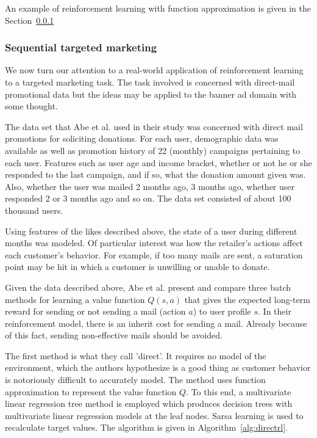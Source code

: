 \documentclass{article} %
\begin{document}
An example of reinforcement learning with function approximation is given in
the Section~\ref{sec:sequential-targeted-marketing}




\subsubsection{Sequential targeted marketing}
\label{sec:sequential-targeted-marketing}
We now turn our attention to a real-world application of reinforcement learning
to a targeted marketing task. The task \cite{abe2002empirical} involved is
concerned with direct-mail promotional data but the ideas may be applied to the
banner ad domain with some thought.

The data set that Abe et al. \cite{abe2002empirical} used in their study was
concerned with direct mail promotions for soliciting donations. For each user,
demographic data was available as well as promotion history of 22 (monthly)
campaigns pertaining to each user.  Features such as user age and income
bracket, whether or not he or she responded to the last campaign, and if so,
what the donation amount given was.  Also, whether the user was mailed 2 months
ago, 3 months ago, whether user responded 2 or 3 months ago and so on. The data
set consisted of about 100 thousand users.

Using features of the likes described above, the state of a user during
different months was modeled. Of particular interest was how the retailer's
actions affect each customer's behavior. For example, if too many mails are
sent, a saturation point may be hit in which a customer is unwilling or unable
to donate.

Given the data described above, Abe et al. \cite{abe2002empirical} present
and compare three batch methods for learning a value function $Q(s,a)$ that
gives the expected long-term reward for sending or not sending a mail (action
$a$) to user profile $s$. In their reinforcement model, there is an inherit
cost for sending a mail. Already because of this fact, sending non-effective
mails should be avoided.

The first method is what they call 'direct'. It requires no model of the
environment, which the authors hypothesize is a good thing as customer behavior
is notoriously difficult to accurately model. The method uses function
approximation to represent the value function $Q$. To this end, a multivariate
linear regression tree method is employed which produces decision trees with
multivariate linear regression models at the leaf nodes. Sarsa learning is used
to recalculate target values. The algorithm is given in
Algorithm~\ref{alg:directrl}.
\end{document}

